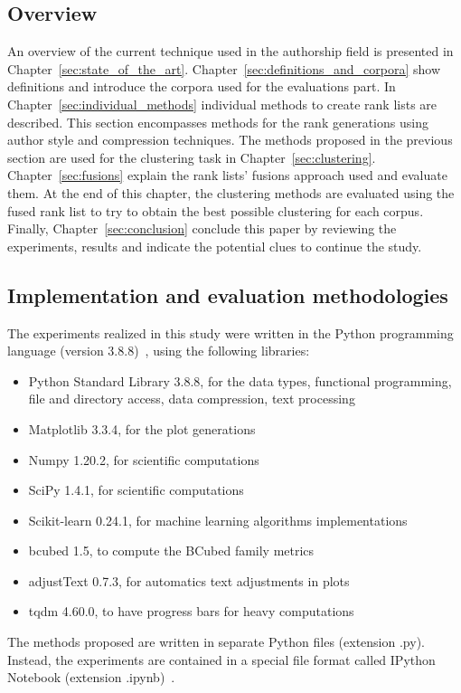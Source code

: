 \subsection{Overview}

An overview of the current technique used in the authorship field is presented in Chapter~\ref{sec:state_of_the_art}.
Chapter~\ref{sec:definitions_and_corpora} show definitions and introduce the corpora used for the evaluations part.
In Chapter~\ref{sec:individual_methods} individual methods to create rank lists are described.
This section encompasses methods for the rank generations using author style and compression techniques.
The methods proposed in the previous section are used for the clustering task in Chapter~\ref{sec:clustering}.
Chapter~\ref{sec:fusions} explain the rank lists' fusions approach used and evaluate them.
At the end of this chapter, the clustering methods are evaluated using the fused rank list to try to obtain the best possible clustering for each corpus.
Finally, Chapter~\ref{sec:conclusion} conclude this paper by reviewing the experiments, results and indicate the potential clues to continue the study.

\subsection{Implementation and evaluation methodologies}

The experiments realized in this study were written in the Python programming language (version 3.8.8)~\cite{python}, using the following libraries:
\begin{itemize}
  \item Python Standard Library 3.8.8, for the data types, functional programming, file and directory access, data compression, text processing~\cite{python_standard_library}
  \item Matplotlib 3.3.4, for the plot generations~\cite{matplotlib}
  \item Numpy 1.20.2, for scientific computations~\cite{numpy}
  \item SciPy 1.4.1, for scientific computations~\cite{scipy}
  \item Scikit-learn 0.24.1, for machine learning algorithms implementations~\cite{sklearn}
  \item bcubed 1.5, to compute the BCubed family metrics~\cite{bcubed_gh}
  \item adjustText 0.7.3, for automatics text adjustments in plots~\cite{adjustText}
  \item tqdm 4.60.0, to have progress bars for heavy computations~\cite{tqdm}
\end{itemize}
The methods proposed are written in separate Python files (extension .py).
Instead, the experiments are contained in a special file format called IPython Notebook (extension .ipynb)~\cite{jupyter}.

